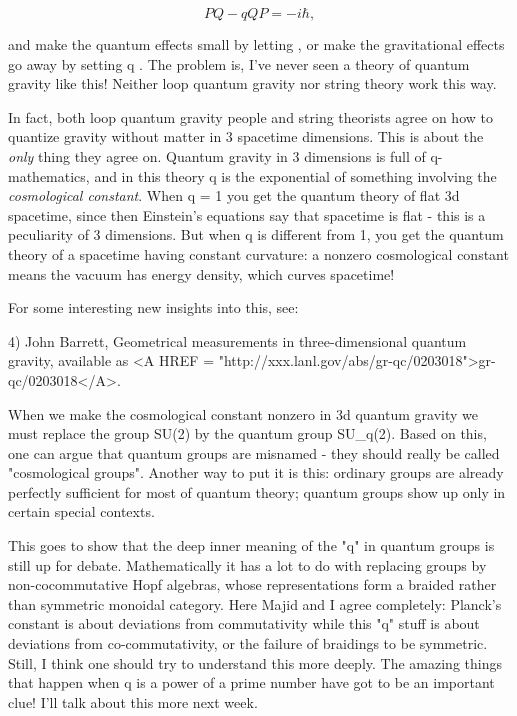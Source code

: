 $$

PQ - qQP = -i \hbar ,
$$
    
and make the quantum effects small by letting \hbar  {}, or make the
gravitational effects go away by setting q .  The problem is, I've
never seen a theory of quantum gravity like this!  Neither loop quantum
gravity nor string theory work this way.  

In fact, both loop quantum gravity people and string theorists agree  
on how to quantize gravity without matter in 3 spacetime dimensions.  
This is about the \emph{only} thing they agree on.  Quantum gravity in 3
dimensions is full of q-mathematics, and in this theory q is the
exponential of something involving the \emph{cosmological constant}.   
When q = 1 you get the quantum theory of flat 3d spacetime, since then
Einstein's equations say that spacetime is flat - this is a peculiarity
of 3 dimensions.  But when q is different from 1, you get the quantum
theory of a spacetime having constant curvature: a nonzero cosmological
constant means the vacuum has energy density, which curves spacetime!  

For some interesting new insights into this, see:

4) John Barrett, Geometrical measurements in three-dimensional
quantum gravity, available as <A HREF = "http://xxx.lanl.gov/abs/gr-qc/0203018">gr-qc/0203018</A>.


When we make the cosmological constant nonzero in 3d quantum gravity we
must replace the group SU(2) by the quantum group SU_{q}(2).  Based on
this, one can argue that quantum groups are misnamed - they should
really be called "cosmological groups".  Another way to put it
is this: ordinary groups are already perfectly sufficient for most of
quantum theory; quantum groups show up only in certain special contexts.

This goes to show that the deep inner meaning of the "q" in
quantum groups is still up for debate.  Mathematically it has a lot to
do with replacing groups by non-cocommutative Hopf algebras, whose
representations form a braided rather than symmetric monoidal category.
Here Majid and I agree completely: Planck's constant is about deviations
from commutativity while this "q" stuff is about deviations
from co-commutativity, or the failure of braidings to be symmetric.
Still, I think one should try to understand this more deeply.  The
amazing things that happen when q is a power of a prime number have got
to be an important clue!  I'll talk about this more next week.


